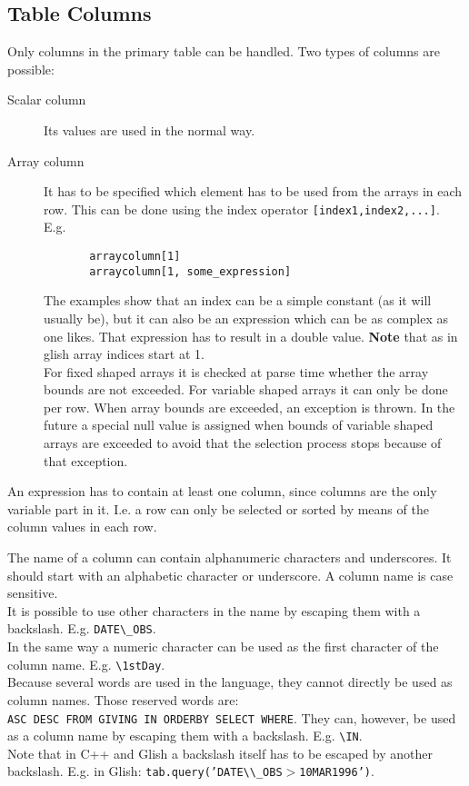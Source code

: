 \subsection{Table Columns}
Only columns in the primary table can be handled.
Two types of columns are possible:
\begin{description}
  \item[ Scalar column] Its values are used in the normal way.
  \item[ Array column]
       It has to be specified which element has to be used from
       the arrays in each row. This can be done using the index operator
       \texttt{[index1,index2,...]}. E.g.
       \begin{verbatim}
       arraycolumn[1]
       arraycolumn[1, some_expression]
       \end{verbatim}
       The examples show that an index can be a simple constant (as it will
       usually be), but it can also be an expression which can be as complex
       as one likes. That expression has to result in a double value.
       \textbf{Note} that as in glish array indices start at 1.
       \\For fixed shaped arrays it is checked at parse time whether
       the array bounds are not exceeded. For variable shaped arrays
       it can only be done per row. When array bounds are exceeded,
       an exception is thrown. In the future a special null value
       is assigned when bounds of variable shaped arrays are exceeded
       to avoid that the selection process stops because of that exception.
\end{description}
An expression has to contain at least one column, since columns
are the only variable part in it. I.e. a row can only be selected
or sorted by means of the column values in each row.

The name of a column can contain alphanumeric characters and underscores.
It should start with an alphabetic character or underscore.
A column name is case sensitive.
\\It is possible to use other characters in the name by
escaping them with a backslash. E.g. \texttt{DATE}\verb+\_+\texttt{OBS}.
\\In the same way a numeric character can be used as the first
character of the column name. E.g. \verb+\+\texttt{1stDay}.
\\
Because several words are used in the language, they cannot directly
be used as column names. Those reserved words are:
\\\texttt{ASC DESC FROM GIVING IN ORDERBY SELECT WHERE}.
They can, however, be used as a column name by escaping
them with a backslash. E.g. \verb+\+\texttt{IN}.
\\Note that in C++ and Glish a backslash itself has to be escaped
by another backslash. E.g. in Glish:
\texttt{tab.query('DATE}\verb+\\_+\texttt{OBS$>$10MAR1996')}.

